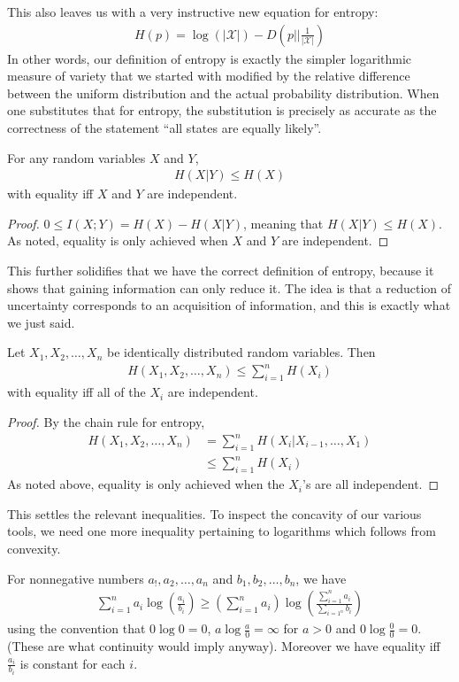 This also leaves us with a very instructive new equation for entropy:
\begin{align}
	H(p) = \log(|\mathcal{X}|)-D\left( p||\frac{1}{|\mathcal{X}|} \right)
\end{align}
In other words, our definition of entropy is exactly the simpler logarithmic measure of variety that we started with modified by the relative difference between the uniform distribution and the actual probability distribution. When one substitutes that for entropy, the substitution is precisely as accurate as the correctness of the statement ``all states are equally likely''.
\begin{theorem}
	For any random variables $X$ and $Y$, 
\begin{align}
	H(X|Y) \leq H(X)
\end{align}
with equality iff $X$ and $Y$ are independent. 
\end{theorem}
\begin{proof}
	$0 \leq I(X;Y) = H(X) - H(X|Y)$, meaning that $H(X|Y) \leq H(X)$. As noted, equality is only achieved when $X$ and $Y$ are independent.
\end{proof}
This further solidifies that we have the correct definition of entropy, because it shows that gaining information can only reduce it. The idea is that a reduction of uncertainty corresponds to an acquisition of information, and this is exactly what we just said. 
\begin{theorem}
	Let $X_1,X_2,\ldots,X_n$ be identically distributed random variables. Then
\begin{align}
	H(X_1,X_2,\ldots,X_n) \leq \sum_{i=1}^n H(X_i)
\end{align}
 with equality iff all of the $X_i$ are independent.
\end{theorem}
\begin{proof}
	By the chain rule for entropy, 
\begin{align}
	H(X_1,X_2,\ldots,X_n) &= \sum_{i=1}^n H(X_i|X_{i-1},\ldots,X_1) \\
		&\leq \sum_{i=1}^n H(X_i)
\end{align}
As noted above, equality is only achieved when the $X_i$'s are all independent. 
\end{proof}
This settles the relevant inequalities. To inspect the concavity of our various tools, we need one more inequality pertaining to logarithms which follows from convexity.
\begin{lemma}
 For nonnegative numbers $a_!,a_2,\ldots,a_n$ and $b_1,b_2,\ldots,b_n$, we have
 \begin{align}
 	\sum_{i=1}^n a_i\log\left(\frac{a_i}{b_i}\right) \geq \left(\sum_{i=1}^n a_i\right)\log\left(\frac{\sum_{i=1}^n a_i}{\sum_{i=1^n}b_i}\right)
 \end{align}
 using the convention that $0\log0 = 0$, $a\log\frac{a}{0} = \infty$ for $a>0$ and $0\log\frac{0}{0} = 0$. (These are what continuity would imply anyway). Moreover we have equality iff $\frac{a_i}{b_i}$ is constant for each $i$. 
\end{lemma}
